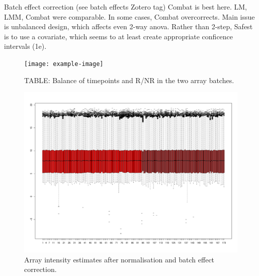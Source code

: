 \begin{outline}
Batch effect correction (see batch effects Zotero tag)
Combat is best here.
LM, LMM, Combat were comparable.
In some cases, Combat overcorrects.
Main issue is unbalanced design, which affects even 2-way anova. Rather than 2-step, Safest is to use a covariate, which seems to at least create appropriate conficence intervals (1e).

\begin{figure}
\texttt{[image: example-image]}
\caption{TABLE: Balance of timepoints and R/NR in the two array batches.}
\end{figure}

\begin{figure}
    \includegraphics[width=1.0\textwidth]{./mainmatter/figures/chapter_02/array_data_setup.array_intensity_boxplots.MaxMean.combat.pdf}
    \caption{Array intensity estimates after normalisation and batch effect correction.}
\end{figure}

\end{outline}

